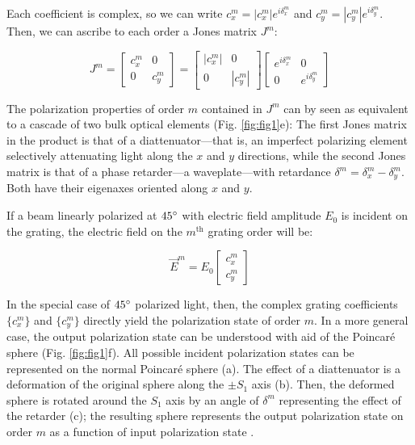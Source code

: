 \documentclass[footinbib,aps,prl,twocolumn,superscriptaddress]{revtex4-1}
\begin{document}
Each coefficient is complex, so we can write $c_x^m = |c_x^m| e^{i \delta_x^m}$ and $c_y^m = |c_y^m| e^{i \delta_y^m}$. Then, we can ascribe to each order a Jones matrix $J^m$:

\begin{equation}
	\label{equivalent}
	J^m = \begin{bmatrix}
			c_x^m & 0 \\ 0 & c_y^m
		  \end{bmatrix} =
		  \begin{bmatrix}
		  	|c_x^m| & 0 \\ 0 & |c_y^m|
		  \end{bmatrix}
		  \begin{bmatrix}
		  	e^{i\delta_x^m} & 0 \\ 0 & e^{i\delta_y^m}
		  \end{bmatrix}
\end{equation}

The polarization properties of order $m$ contained in $J^m$ can by seen as equivalent to a cascade of two bulk optical elements (Fig. \ref{fig:fig1}e): The first Jones matrix in the product is that of a diattenuator---that is, an imperfect polarizing element selectively attenuating light along the $x$ and $y$ directions, while the second Jones matrix is that of a phase retarder---a waveplate---with retardance $\delta^m = \delta_x^m - \delta_y^m$. Both have their eigenaxes oriented along $x$ and $y$. 

If a beam linearly polarized at $45\degree$ with electric field amplitude $E_0$ is incident on the grating, the electric field on the $m^{\text{th}}$ grating order will be:

\begin{equation}
\vec{E}^m =  E_0\begin{bmatrix} c_x^m \\ c_y^m \end{bmatrix}
\end{equation}

In the special case of $45\degree$ polarized light, then, the complex grating coefficients $\{c_x^m\}$ and $\{c_y^m\}$ directly yield the polarization state of order $m$. In a more general case, the output polarization state can be understood with aid of the Poincar\'e sphere (Fig. \ref{fig:fig1}f). All possible incident polarization states can be represented on the normal Poincar\'e sphere (a). The effect of a diattenuator is a deformation of the original sphere along the $\pm S_1$ axis (b). Then, the deformed sphere is rotated around the $S_1$ axis by an angle of $\delta^m$ representing the effect of the retarder (c); the resulting sphere represents the output polarization state on order $m$ as a function of input polarization state \cite{Damask2005}.
\end{document}
